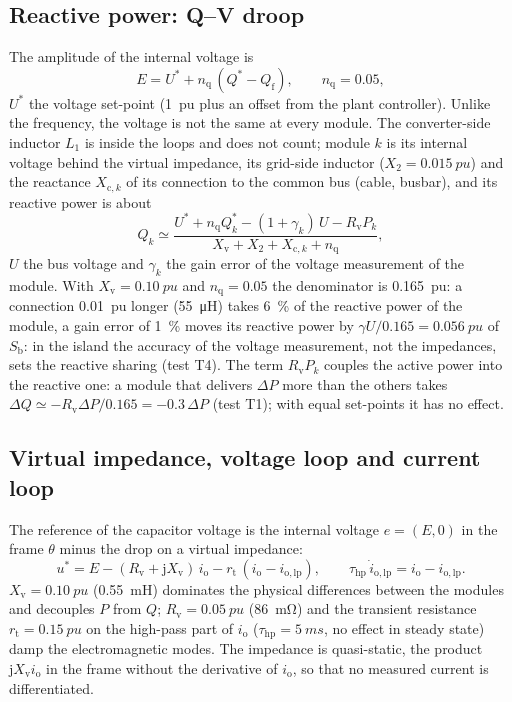 \documentclass[11pt,a4paper]{scrartcl}
\newcommand{\ped}[1]{_{\mathrm{#1}}}
\newcommand{\jj}{\mathrm{j}}
\begin{document}
\begin{onehalfspace}
\subsection{Reactive power: Q--V droop}

The amplitude of the internal voltage is
\begin{equation}
	E = U^* + n\ped{q}\,(Q^* - Q\ped{f}), \qquad n\ped{q} = 0.05 ,
	\label{eq:qv}
\end{equation}
$U^*$ the voltage set-point (\SI{1}{pu} plus an offset from the plant controller). Unlike the frequency, the voltage is not the same at every module. The converter-side inductor $L_1$ is inside the loops and does not count; module $k$ is its internal voltage behind the virtual impedance, its grid-side inductor ($X_2 = \SI{0.015}{pu}$) and the reactance $X\ped{c,\mathit{k}}$ of its connection to the common bus (cable, busbar), and its reactive power is about
\begin{equation}
	Q_k \simeq \frac{U^* + n\ped{q} Q^*_k - (1 + \gamma_k)\,U - R\ped{v} P_k}{X\ped{v} + X_2 + X\ped{c,\mathit{k}} + n\ped{q}} ,
	\label{eq:qshare}
\end{equation}
$U$ the bus voltage and $\gamma_k$ the gain error of the voltage measurement of the module. With $X\ped{v} = \SI{0.10}{pu}$ and $n\ped{q} = 0.05$ the denominator is \SI{0.165}{pu}: a connection \SI{0.01}{pu} longer (\SI{55}{\micro\henry}) takes \SI{6}{\percent} of the reactive power of the module, a gain error of \SI{1}{\percent} moves its reactive power by $\gamma U/0.165 = \SI{0.056}{pu}$ of $S\ped{b}$: in the island the accuracy of the voltage measurement, not the impedances, sets the reactive sharing (test T4). The term $R\ped{v} P_k$ couples the active power into the reactive one: a module that delivers $\Delta P$ more than the others takes $\Delta Q \simeq -R\ped{v}\Delta P/0.165 = -0.3\,\Delta P$ (test T1); with equal set-points it has no effect.

\subsection{Virtual impedance, voltage loop and current loop}

The reference of the capacitor voltage is the internal voltage $e = (E, 0)$ in the frame $\theta$ minus the drop on a virtual impedance:
\begin{equation}
	u^* = E - (R\ped{v} + \jj X\ped{v})\, i\ped{o} - r\ped{t}\,(i\ped{o} - i\ped{o,lp}), \qquad \tau\ped{hp}\,\dot i\ped{o,lp} = i\ped{o} - i\ped{o,lp} .
	\label{eq:vi}
\end{equation}
$X\ped{v} = \SI{0.10}{pu}$ (\SI{0.55}{mH}) dominates the physical differences between the modules and decouples $P$ from $Q$; $R\ped{v} = \SI{0.05}{pu}$ (\SI{86}{\milli\ohm}) and the transient resistance $r\ped{t} = \SI{0.15}{pu}$ on the high-pass part of $i\ped{o}$ ($\tau\ped{hp} = \SI{5}{ms}$, no effect in steady state) damp the electromagnetic modes. The impedance is quasi-static, the product $\jj X\ped{v} i\ped{o}$ in the frame without the derivative of $i\ped{o}$, so that no measured current is differentiated.


\end{onehalfspace}
\end{document}
